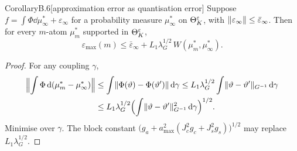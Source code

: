
\begin{thm}{Corollary}{B.6}[approximation error as quantisation error]
Suppose $f=\int\Phi\dd\mu^*_\infty+\varepsilon_\infty$ for a probability measure $\mu^*_\infty$ on $\Theta_K^{\varepsilon}$, with
$\lVert \varepsilon_\infty\rVert\le\bar\varepsilon_\infty$. Then for every $m$-atom $\mu^*_m$ supported in $\Theta_K^{\varepsilon}$,
\[
  \varepsilon_{\max}(m)\le\bar\varepsilon_\infty+L_1\lambda_G^{1/2}\,W(\mu^*_m,\mu^*_\infty).
\]
\end{thm}


\begin{proof}
For any coupling $\gamma$,
\begin{align*}
  \Bigl\lVert\int\Phi\,\mathrm{d}(\mu^*_m-\mu^*_\infty)\Bigr\rVert
  &\le\int\lVert \Phi(\vartheta)-\Phi(\vartheta')\rVert\,\mathrm{d}\gamma
  \le L_1\lambda_G^{1/2}\int\lVert \vartheta-\vartheta'\rVert_{G^{-1}}\,\mathrm{d}\gamma\\
  &\le L_1\lambda_G^{1/2}\Bigl(\int\lVert \vartheta-\vartheta'\rVert^2_{G^{-1}}\,\mathrm{d}\gamma\Bigr)^{1/2}.
\end{align*}
Minimise over $\gamma$. The block constant $\bigl(g_a+a_{\max}^2(J_c^2g_c+J_s^2g_s)\bigr)^{1/2}$ may replace
$L_1\lambda_G^{1/2}$.
\end{proof}

